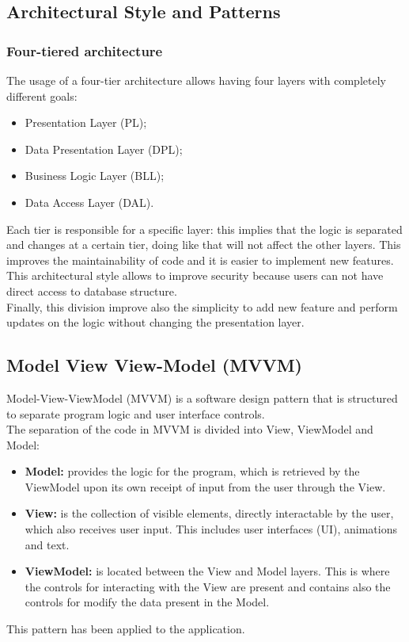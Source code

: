 \subsection{Architectural Style and Patterns}
\subsubsection{Four-tiered architecture}
The usage of a four-tier architecture allows having four layers with completely different goals:
\begin{itemize}
    \item Presentation Layer (PL);
    \item Data Presentation Layer (DPL);
    \item Business Logic Layer (BLL);
    \item Data Access Layer (DAL).
\end{itemize}

Each tier is responsible for a specific layer: this implies that the logic is separated and changes at a certain tier, doing like that will not affect the other layers. This improves the maintainability of code and it is easier to implement new features.
\\This architectural style allows to improve security because users can not have direct access to database structure.\\ 
Finally, this division improve also the simplicity to add new feature and perform updates on the logic without changing the presentation layer.

\subsection{Model View View-Model (MVVM)}
Model-View-ViewModel (MVVM) is a software design pattern that is structured to separate program logic and user interface controls.\\
The separation of the code in MVVM is divided into View, ViewModel and Model:
\begin{itemize}
    \item \textbf{Model:} provides the logic for the program, which is retrieved by the ViewModel upon its own receipt of input from the user through the View.
    \item \textbf{View:} is the collection of visible elements, directly interactable by the user, which also receives user input. This includes user interfaces (UI), animations and text.
    \item \textbf{ViewModel:} is located between the View and Model layers. This is where the controls for interacting with the View are present and contains also the controls for modify the data present in the Model.
\end{itemize}
This pattern has been applied to the application.

